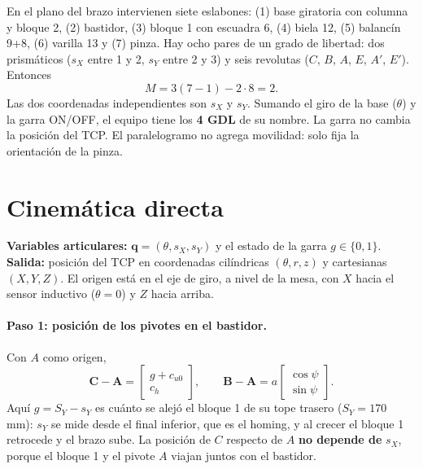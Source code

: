 \documentclass[a4paper,12pt]{article}
\begin{document}
En el plano del brazo intervienen siete eslabones: (1) base giratoria con columna y bloque 2, (2) bastidor,
(3) bloque 1 con escuadra 6, (4) biela 12, (5) balancín 9+8, (6) varilla 13 y (7) pinza. Hay ocho pares de
un grado de libertad: dos prismáticos ($s_X$ entre 1 y 2, $s_Y$ entre 2 y 3) y seis revolutas ($C$, $B$,
$A$, $E$, $A'$, $E'$). Entonces
\begin{equation}
M = 3(7-1) - 2\cdot 8 = 2 .
\end{equation}
Las dos coordenadas independientes son $s_X$ y $s_Y$. Sumando el giro de la base ($\theta$) y la garra
ON/OFF, el equipo tiene los \textbf{4 GDL} de su nombre. La garra no cambia la posición del TCP. El
paralelogramo no agrega movilidad: solo fija la orientación de la pinza.

\section{Cinemática directa}

\textbf{Variables articulares:} $\mathbf{q} = (\theta, s_X, s_Y)$ y el estado de la garra $g \in \{0,1\}$.
\textbf{Salida:} posición del TCP en coordenadas cilíndricas $(\theta, r, z)$ y cartesianas $(X, Y, Z)$.
El origen está en el eje de giro, a nivel de la mesa, con $X$ hacia el sensor inductivo ($\theta = 0$) y
$Z$ hacia arriba.

\paragraph{Paso 1: posición de los pivotes en el bastidor.} Con $A$ como origen,
\begin{equation}
\mathbf{C}-\mathbf{A} = \begin{bmatrix} g + c_{u0}\\ c_h\end{bmatrix},\qquad
\mathbf{B}-\mathbf{A} = a\begin{bmatrix}\cos\psi\\ \sin\psi\end{bmatrix}.
\end{equation}
Aquí $g = S_Y - s_Y$ es cuánto se alejó el bloque 1 de su tope trasero ($S_Y = 170$ mm): $s_Y$ se mide desde
el final inferior, que es el homing, y al crecer el bloque 1 retrocede y el brazo sube. La posición de $C$
respecto de $A$ \textbf{no depende de} $s_X$, porque el bloque 1 y el pivote $A$ viajan
juntos con el bastidor.
\end{document}
